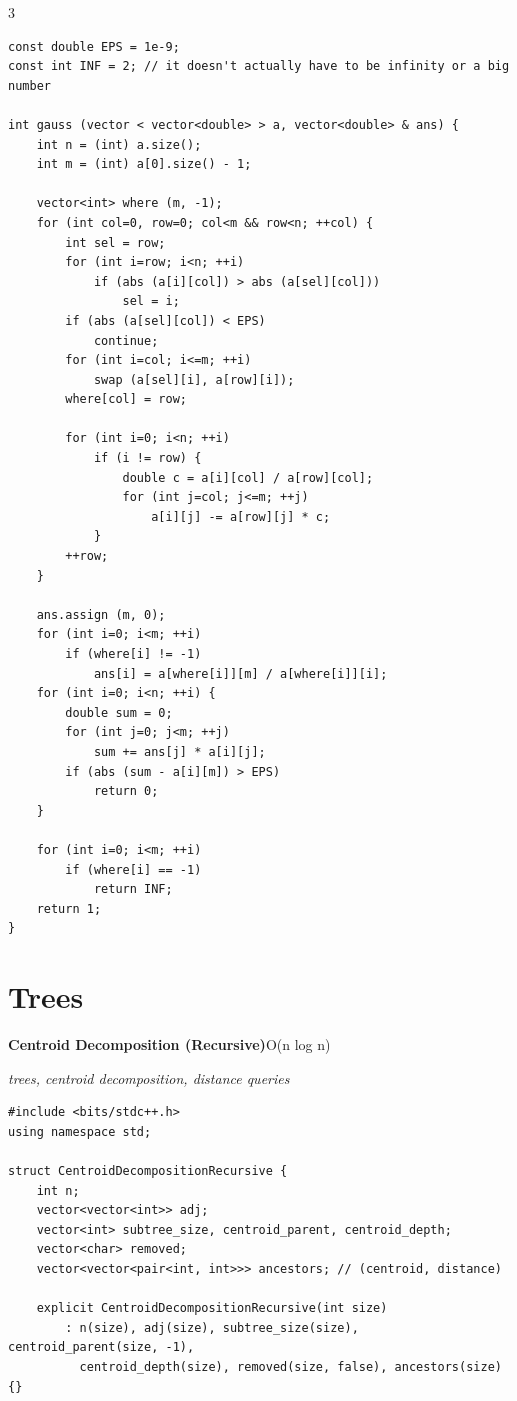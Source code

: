 \documentclass[8pt,a4paper,landscape]{article}
\begin{document}
\begin{multicols}{3}
\begin{lstlisting}
const double EPS = 1e-9;
const int INF = 2; // it doesn't actually have to be infinity or a big number

int gauss (vector < vector<double> > a, vector<double> & ans) {
    int n = (int) a.size();
    int m = (int) a[0].size() - 1;

    vector<int> where (m, -1);
    for (int col=0, row=0; col<m && row<n; ++col) {
        int sel = row;
        for (int i=row; i<n; ++i)
            if (abs (a[i][col]) > abs (a[sel][col]))
                sel = i;
        if (abs (a[sel][col]) < EPS)
            continue;
        for (int i=col; i<=m; ++i)
            swap (a[sel][i], a[row][i]);
        where[col] = row;

        for (int i=0; i<n; ++i)
            if (i != row) {
                double c = a[i][col] / a[row][col];
                for (int j=col; j<=m; ++j)
                    a[i][j] -= a[row][j] * c;
            }
        ++row;
    }

    ans.assign (m, 0);
    for (int i=0; i<m; ++i)
        if (where[i] != -1)
            ans[i] = a[where[i]][m] / a[where[i]][i];
    for (int i=0; i<n; ++i) {
        double sum = 0;
        for (int j=0; j<m; ++j)
            sum += ans[j] * a[i][j];
        if (abs (sum - a[i][m]) > EPS)
            return 0;
    }

    for (int i=0; i<m; ++i)
        if (where[i] == -1)
            return INF;
    return 1;
}
\end{lstlisting}
\vspace{1pt}
\section*{Trees}
\textbf{Centroid Decomposition (Recursive)}\hfill{\scriptsize O(n log n)}\par
{\scriptsize\itshape trees, centroid decomposition, distance queries}\par
\begin{lstlisting}
#include <bits/stdc++.h>
using namespace std;

struct CentroidDecompositionRecursive {
    int n;
    vector<vector<int>> adj;
    vector<int> subtree_size, centroid_parent, centroid_depth;
    vector<char> removed;
    vector<vector<pair<int, int>>> ancestors; // (centroid, distance)

    explicit CentroidDecompositionRecursive(int size)
        : n(size), adj(size), subtree_size(size), centroid_parent(size, -1),
          centroid_depth(size), removed(size, false), ancestors(size) {}


\end{lstlisting}
\end{multicols}
\end{document}
